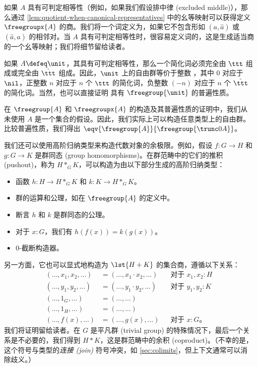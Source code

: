 %

如果 $A$ 具有可判定相等性（例如，如果我们假设排中律 (excluded middle)），那么通过 \cref{lem:quotient-when-canonical-representatives} 中的幺等映射可以获得定义 $\freegroupx{A}$ 的商。我们将一个词定义为，如果它不包含形如 $(a,\hat a)$ 或 $(\hat a,a)$ 的相邻对。当 $A$ 具有可判定相等性时，很容易定义词的，这是生成适当商的一个幺等映射；我们将细节留给读者。

如果 $A\defeq \unit$，其具有可判定相等性，那么一个简化词必须完全由 $\ttt$ 组成或完全由 $\hat{\ttt}$ 组成。因此，$\unit$ 上的自由群等价于整数 \Z，其中 $0$ 对应于 $\nil$，正整数 $n$ 对应于 $n$ 个 $\ttt$ 的简化词，负整数 $(-n)$ 对应于 $n$ 个 $\hat{\ttt}$ 的简化词。当然，也可以直接证明 \Z 具有 $\freegroup{\unit}$ 的普遍性质。

\begin{rmk}\label{thm:freegroup-nonset}
在 $\freegroup{A}$ 和 $\freegroupx{A}$ 的构造及其普遍性质的证明中，我们从未使用 $A$ 是一个集合的假设。因此，我们实际上可以构造任意类型上的自由群。比较普遍性质，我们得出 $\eqv{\freegroup{A}}{\freegroup{\trunc0A}}$。
\end{rmk}

%

%
我们还可以使用高阶归纳类型来构造代数对象的余极限。例如，假设 $f:G\to H$ 和 $g:G\to K$ 是群同态 (group homomorphisms)。在群范畴中的它们的推积 (pushout)，称为%
%
$H *_G K$，可以构造为由以下部分生成的高阶归纳类型：
\begin{itemize}
  \item 函数 $h:H\to H *_G K$ 和 $k:K\to H *_G K$。
  \item 群的运算和公理，如在 $\freegroup{A}$ 的定义中。
  \item 断言 $h$ 和 $k$ 是群同态的公理。
  \item 对于 $x:G$，我们有 $h(f(x)) = k(g(x))$。
  \item $0$-截断构造器。
\end{itemize}
另一方面，它也可以显式地构造为 $\lst{H+K}$ 的集合商，遵循以下关系：
\begin{align*}
(\dots, x_1, x_2, \dots) &= (\dots, x_1\cdot x_2, \dots)
& &\text{对于 $x_1,x_2:H$}\\
(\dots, y_1, y_2, \dots) &= (\dots, y_1\cdot y_2, \dots)
& &\text{对于 $y_1,y_2:K$}\\
(\dots, 1_G, \dots) &= (\dots, \dots) &&  \\
(\dots, 1_H, \dots) &= (\dots, \dots) &&  \\
(\dots, f(x), \dots) &= (\dots, g(x), \dots)
& &\text{对于 $x:G$。}
\end{align*}
我们将证明留给读者。在 $G$ 是平凡群 (trivial group) 的特殊情况下，最后一个关系是不必要的，我们得到%
$H*K$，这是群范畴中的余积 (coproduct)。（不幸的是，这个符号与类型的\emph{连接 (join)} 符号冲突，如 \cref{sec:colimits}，但上下文通常可以消除歧义。）

